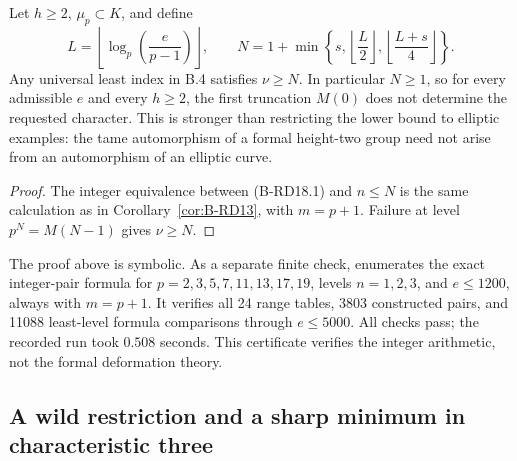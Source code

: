 \begin{corollary}
\label{cor:B-RD18}
Let $h\geq2$, $\mu_p\subset K$, and define
\[
 L=\left\lfloor\log_p\!\left(\frac e{p-1}\right)\right\rfloor,
 \qquad
 N=1+\min\left\{s,\left\lfloor\frac L2\right\rfloor,
                         \left\lfloor\frac{L+s}4\right\rfloor\right\}.
\]
Any universal least index in B.4 satisfies $\nu\geq N$.
In particular $N\geq1$, so for every admissible $e$ and every
$h\geq2$, the first truncation $M(0)$ does not determine the
requested character. This is stronger than restricting the lower
bound to elliptic examples: the tame automorphism of a formal
height-two group need not arise from an automorphism of an
elliptic curve.
\end{corollary}
\begin{proof}
The integer equivalence between (B-RD18.1) and $n\leq N$ is the
same calculation as in Corollary~\ref{cor:B-RD13}, with
$m=p+1$. Failure at level $p^N=M(N-1)$ gives $\nu\geq N$.
\end{proof}

\begin{remark}\label{auto:B:c9c8e4df645d}

The proof above is symbolic. As a separate finite check,
 enumerates the exact integer-pair
formula for $p=2,3,5,7,11,13,17,19$, levels $n=1,2,3$, and
$e\leq1200$, always with $m=p+1$. It verifies all 24 range tables,
3803 constructed pairs, and 11088 least-level formula comparisons
through $e\leq5000$. All checks pass; the recorded run took
$0.508$ seconds. This certificate verifies the integer arithmetic,
not the formal deformation theory.
\end{remark}


\subsection{A wild restriction and a sharp minimum in characteristic three}

